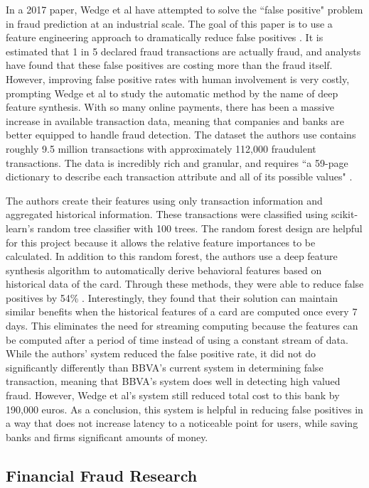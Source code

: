 \documentclass[midd]{thesis}
\begin{document}
In a 2017 paper, Wedge et al have attempted to solve the ``false positive" problem in fraud prediction at an industrial scale. The goal of this paper is to use a feature engineering approach to dramatically reduce false positives \cite{Wedge}. It is estimated that 1 in 5 declared fraud transactions are actually fraud, and analysts have found that these false positives are costing more than the fraud itself. However, improving false positive rates with human involvement is very costly, prompting Wedge et al to study the automatic method by the name of deep feature synthesis. With so many online payments, there has been a massive increase in available transaction data, meaning that companies and banks are better equipped to handle fraud detection. The dataset the authors use contains roughly 9.5 million transactions with approximately 112,000 fraudulent transactions. The data is incredibly rich and granular, and requires ``a 59-page dictionary to describe each transaction attribute and all of its possible values" \cite{Wedge}. 

The authors create their features using only transaction information and aggregated historical information. These transactions were classified using scikit-learn's random tree classifier with 100 trees. The random forest design are helpful for this project because it allows the relative feature importances to be calculated. In addition to this random forest, the authors use a deep feature synthesis algorithm to automatically derive behavioral features based on historical data of the card. Through these methods, they were able to reduce false positives by 54\% \cite{Wedge}. Interestingly, they found that their solution can maintain similar benefits when the historical features of a card are computed once every 7 days. This eliminates the need for streaming computing because the features can be computed after a period of time instead of using a constant stream of data. While the authors' system reduced the false positive rate, it did not do significantly differently than BBVA's current system in determining false transaction, meaning that BBVA's system does well in detecting high valued fraud. However, Wedge et al's system still reduced total cost to this bank by 190,000 euros. As a conclusion, this system is helpful in reducing false positives in a way that does not increase latency to a noticeable point for users, while saving banks and firms significant amounts of money.


\subsection{Financial Fraud Research}
\end{document}
